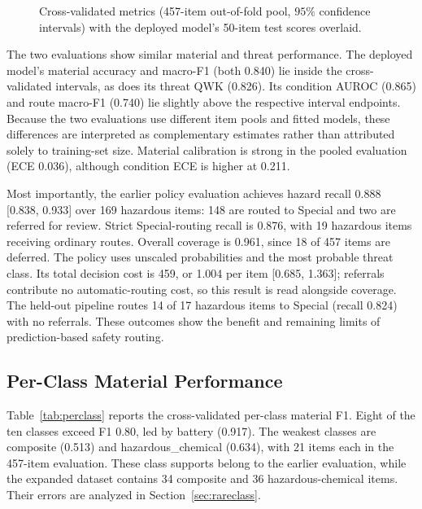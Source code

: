 \begin{figure}[!ht]
    \centering
    \caption{Cross-validated metrics (457-item out-of-fold pool, $95\%$ confidence intervals) with the deployed model's 50-item test scores overlaid.}
    \label{fig:kfoldci}
\end{figure}

The two evaluations show similar material and threat performance. The deployed model's material accuracy and macro-F1 (both 0.840) lie inside the cross-validated intervals, as does its threat QWK (0.826). Its condition AUROC (0.865) and route macro-F1 (0.740) lie slightly above the respective interval endpoints. Because the two evaluations use different item pools and fitted models, these differences are interpreted as complementary estimates rather than attributed solely to training-set size. Material calibration is strong in the pooled evaluation (ECE 0.036), although condition ECE is higher at 0.211.

Most importantly, the earlier policy evaluation achieves hazard recall 0.888 [0.838, 0.933] over 169 hazardous items: 148 are routed to Special and two are referred for review. Strict Special-routing recall is 0.876, with 19 hazardous items receiving ordinary routes. Overall coverage is 0.961, since 18 of 457 items are deferred. The policy uses unscaled probabilities and the most probable threat class. Its total decision cost is 459, or 1.004 per item [0.685, 1.363]; referrals contribute no automatic-routing cost, so this result is read alongside coverage. The held-out pipeline routes 14 of 17 hazardous items to Special (recall 0.824) with no referrals. These outcomes show the benefit and remaining limits of prediction-based safety routing.

\subsection{Per-Class Material Performance}
Table~\ref{tab:perclass} reports the cross-validated per-class material F1. Eight of the ten classes exceed F1 0.80, led by battery (0.917). The weakest classes are composite (0.513) and hazardous\_chemical (0.634), with 21 items each in the 457-item evaluation. These class supports belong to the earlier evaluation, while the expanded dataset contains 34 composite and 36 hazardous-chemical items. Their errors are analyzed in Section~\ref{sec:rareclass}.

